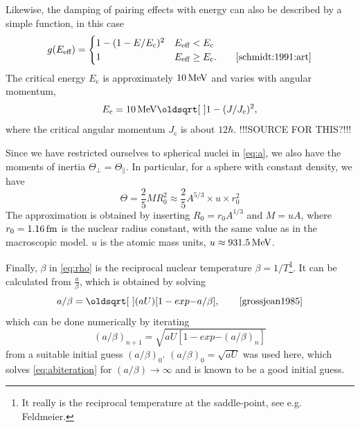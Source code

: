 Likewise, the damping of pairing effects with energy can also be described by a simple function, in this case
\begin{equation}
g(E_\text{eff}) = \begin{cases} 1-(1-E/E_\text{c})^2 & E_\text{eff} < E_\text{c} \\
 1 & E_\text{eff} \ge E_\text{c}.\qquad\cite{schmidt:1991:art}
\end{cases}
\end{equation}
The critical energy $E_\text{c}$ is approximately $\unit[10]{MeV}$ and varies with angular momentum, 
\begin{equation}
E_\text{c} = \unit[10]{MeV}\sqrt{1-(J/J_\text{c})^2},
\end{equation}
where the critical angular momentum $J_\text{c}$ is about $12\hbar$. !!!SOURCE FOR THIS?!!!

Since we have restricted ourselves to spherical nuclei in \eqref{eq:a}, we also have the moments of inertia $\Theta_\perp = \Theta_\parallel$. In particular, for a sphere with constant density, we have
\begin{equation}
\Theta = \frac{2}{5} M R_0^2 \approx \frac{2}{5} A^{5/3}\times u \times r_0^2
\end{equation}
The approximation is obtained by inserting $R_0 = r_0 A^{1/3}$ and $M=u A$, where $r_0=\unit[1.16]{fm}$ is the nuclear radius constant, with the same value as in the macroscopic model\cite{moller1995}. $u$ is the atomic mass units, $u \approx \unit[931.5]{MeV}$.

Finally, $\beta$ in \eqref{eq:rho} is the reciprocal nuclear temperature $\beta=1/T$\footnote{It really is the reciprocal temperature at the saddle-point, see e.g. Feldmeier\cite{grossjean1985}.}. It can be calculated from $\tfrac{a}{\beta}$, which is obtained by solving
\begin{equation}
a/\beta=\sqrt{(aU)[1 -exp{-a/\beta}]},\qquad\cite{grossjean1985}\label{eq:abiteration}
\end{equation}
which can be done numerically by iterating
\begin{equation}
(a/\beta)_{n+1}=\sqrt{aU[1 -exp{-(a/\beta)_n}]}
\end{equation}
from a suitable initial guess $(a/\beta)_{0}$. $(a/\beta)_{0}=\sqrt{aU}$ was used here, which solves \eqref{eq:abiteration} for $(a/\beta) \to \infty$ and is known to be a good initial guess\cite{grossjean1985}.

\def\bredd{0.5}

